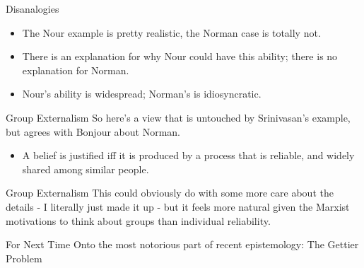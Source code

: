 \documentclass[
  17pt,
  letterpaper,
  ignorenonframetext,
  aspectratio=169,
  handout]{beamer}
\providecommand{\tightlist}{%
  \setlength{\itemsep}{0pt}\setlength{\parskip}{0pt}}\usepackage{longtable,booktabs,array}
\begin{document}
\begin{frame}{Disanalogies}
\protect\hypertarget{disanalogies}{}
\begin{itemize}[<+->]
\tightlist
\item
  The Nour example is pretty realistic, the Norman case is totally not.
\item
  There is an explanation for why Nour could have this ability; there is
  no explanation for Norman.
\item
  Nour's ability is widespread; Norman's is idiosyncratic.
\end{itemize}
\end{frame}

\begin{frame}{Group Externalism}
\protect\hypertarget{group-externalism}{}
So here's a view that is untouched by Srinivasan's example, but agrees
with Bonjour about Norman.

\begin{itemize}[<+->]
\tightlist
\item
  A belief is justified iff it is produced by a process that is
  reliable, and widely shared among similar people.
\end{itemize}
\end{frame}

\begin{frame}{Group Externalism}
\protect\hypertarget{group-externalism-1}{}
This could obviously do with some more care about the details - I
literally just made it up - but it feels more natural given the Marxist
motivations to think about groups than individual reliability.
\end{frame}

\begin{frame}{For Next Time}
\protect\hypertarget{for-next-time}{}
Onto the most notorious part of recent epistemology: The Gettier Problem
\end{frame}
\end{document}
